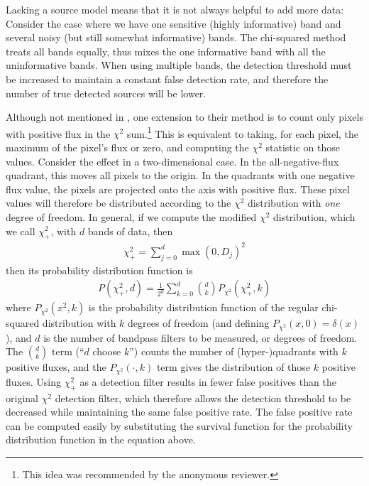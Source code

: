 \documentclass[11pt,letterpaper,linenumbers]{aastex7}
\newcommand{\chipos}{\chi_+}
\begin{document}
Lacking a source model means that it is not always helpful to add more
data: Consider the case where we have one sensitive (highly
informative) band and several noisy (but still somewhat informative)
bands.  The chi-squared method treats all bands equally, thus mixes
the one informative band with all the uninformative bands.  When using
multiple bands, the detection threshold must be increased to maintain
a constant false detection rate, and therefore the number of true
detected sources will be lower.


Although not mentioned in \cite{szalay1999}, one extension to their
method is to count only pixels with positive flux in the $\chi^2$
sum.\footnote{This idea was recommended by the anonymous reviewer.}
This is equivalent to taking, for each pixel, the maximum of the
pixel's flux or zero, and computing the $\chi^2$ statistic on those
values.  Consider the effect in a two-dimensional case.  In the
all-negative-flux quadrant, this moves all pixels to the origin.  In
the quadrants with one negative flux value, the pixels are projected
onto the axis with positive flux.  These pixel values will therefore
be distributed according to the $\chi^2$ distribution with \emph{one}
degree of freedom.  In general, if we compute the modified $\chi^2$
distribution, which we call $\chipos^2$, with $d$ bands of data, then
\begin{eqnarray}
  \chipos^2 = \sum_{j=0}^d \max(0, D_j)^2
  \label{eqn:chipos}
\end{eqnarray}
then its probability distribution function is
\begin{eqnarray}
P(\chipos^2, d) = \frac{1}{2^d} \sum_{k=0}^d \binom{d}{k} P_{\chi^2}(\chipos^2, k)
\end{eqnarray}
where $P_{\chi^2}(x^2, k)$ is the probability distribution function of
the regular chi-squared distribution with $k$ degrees of freedom (and
defining $P_{\chi^2}(x, 0) = \delta(x)$), and $d$ is the number of
bandpass filters to be measured, or degrees of freedom.  The
$\binom{d}{k}$ term (``$d$ choose $k$'') counts the number of (hyper-)quadrants with $k$
positive fluxes, and the $P_{\chi^2}(\cdot, k)$ term gives the distribution of those $k$ positive fluxes.  Using
$\chipos^2$ as a detection filter results in fewer false positives
than the original $\chi^2$ detection filter, which therefore allows
the detection threshold to be decreased while maintaining the same
false positive rate.  The false positive rate can be computed easily
by substituting the survival function for the probability distribution
function in the equation above.
\end{document}
